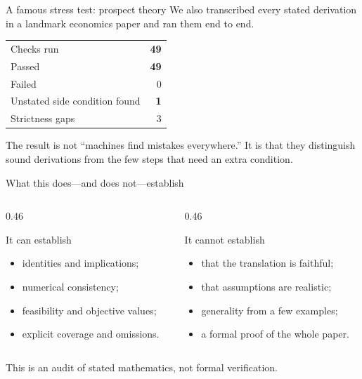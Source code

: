 \documentclass[aspectratio=169,11pt]{beamer}
\begin{document}
\begin{frame}{A famous stress test: prospect theory}
  We also transcribed every stated derivation in a landmark economics paper and ran them end to end.
  \vfill
  \begin{center}
  \begin{tabular}{@{}lr@{}}
    \toprule
    Checks run & \textbf{49} \\
    Passed & \textbf{49} \\
    Failed & 0 \\
    Unstated side condition found & \textbf{1} \\
    Strictness gaps & 3 \\
    \bottomrule
  \end{tabular}
  \end{center}
  \vfill
  The result is not ``machines find mistakes everywhere.'' It is that they distinguish sound derivations from the few steps that need an extra condition.
\end{frame}

\begin{frame}{What this does---and does not---establish}
  \begin{columns}[T]
    \begin{column}{0.46\textwidth}
      \begin{block}{It can establish}
        \begin{itemize}
          \item identities and implications;
          \item numerical consistency;
          \item feasibility and objective values;
          \item explicit coverage and omissions.
        \end{itemize}
      \end{block}
    \end{column}
    \begin{column}{0.46\textwidth}
      \begin{block}{It cannot establish}
        \begin{itemize}
          \item that the translation is faithful;
          \item that assumptions are realistic;
          \item generality from a few examples;
          \item a formal proof of the whole paper.
        \end{itemize}
      \end{block}
    \end{column}
  \end{columns}
  \vfill
  \centering\alert{This is an audit of stated mathematics, not formal verification.}
\end{frame}
\end{document}
